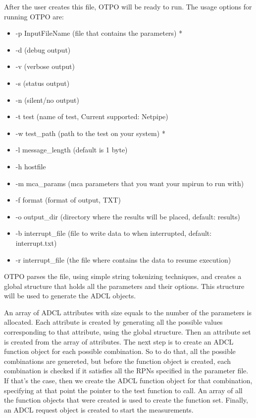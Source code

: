 After the user creates this file, OTPO will be ready to run. The usage options
for running OTPO are:
\begin{itemize}
\item -p InputFileName (file that contains the parameters) *
\item -d (debug output)
\item -v (verbose output)
\item -s (status output)
\item -n (silent/no output)
\item -t test (name of test, Current supported: Netpipe)
\item -w test\_path (path to the test on your system) *
\item -l message\_length (default is 1 byte)
\item -h hostfile
\item -m mca\_params (mca parameters that you want your mpirun to run with)
\item -f format (format of output, TXT)
\item -o output\_dir (directory where the results will be placed, default: results)
\item -b interrupt\_file (file to write data to when interrupted, default:
  interrupt.txt)
\item -r interrupt\_file (the file where contains the data to resume execution) 
\end{itemize}

OTPO parses the file, using simple string tokenizing techniques, and creates a
global structure that holds all the parameters and their options. This
structure will be used to generate the ADCL objects. 

An array of ADCL attributes with size equals to the number of the parameters
is allocated. Each attribute is created by generating all the possible values
corresponding to that attribute, using the global structure. Then an attribute
set is created from the array of attributes. The next step is to create an
ADCL function object for each possible combination. So to do that, all the
possible combinations are genereted, but before the function object is
created, each combination is checked if it satisfies all the RPNs specified in
the parameter file. If that's the case, then we create the ADCL function
object for that combination, specifying at that point the pointer to the test
function to call. An array of all the function objects that were created is
used to create the function set. Finally, an ADCL request object is created to
start the measurements.


